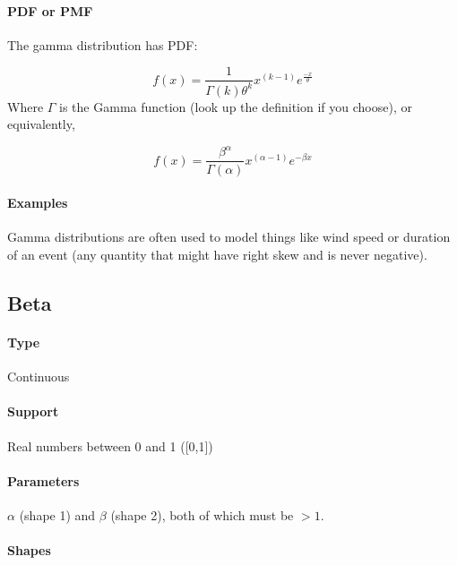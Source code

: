 \documentclass[]{book}
\let\oldparagraph\paragraph
\renewcommand{\paragraph}[1]{\oldparagraph{#1}\mbox{}}
\begin{document}
\hypertarget{pdf-or-pmf-1}{%
\paragraph{PDF or PMF}\label{pdf-or-pmf-1}}

The gamma distribution has PDF:

\[ f(x) = \frac{1}{\Gamma(k) \theta^k}x^{(k-1)}e^{\frac{-x}{\theta}}\]
Where \(\Gamma\) is the Gamma function (look up the definition if you choose),
or equivalently,

\[ f(x) = \frac{\beta^{\alpha}}{\Gamma(\alpha)}x^{(\alpha-1)}e^{-\beta x}\]

\hypertarget{examples-1}{%
\paragraph{Examples}\label{examples-1}}

Gamma distributions are often used to model things like wind speed or duration of an event (any quantity that might have right skew and is never negative).

\hypertarget{beta}{%
\subsection{Beta}\label{beta}}

\hypertarget{type-2}{%
\paragraph{Type}\label{type-2}}

Continuous

\hypertarget{support-2}{%
\paragraph{Support}\label{support-2}}

Real numbers between 0 and 1 ({[}0,1{]})

\hypertarget{parameters-2}{%
\paragraph{Parameters}\label{parameters-2}}

\(\alpha\) (shape 1) and \(\beta\) (shape 2), both of which must be \(>1\).

\hypertarget{shapes-2}{%
\paragraph{Shapes}\label{shapes-2}}
\end{document}
